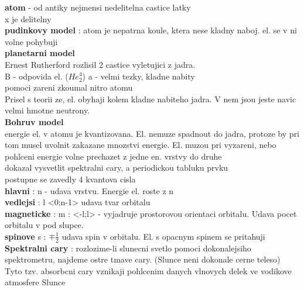 \documentclass{report}
\begin{document}
\vspace{0.5cm}
\textbf{atom} - od antiky nejmensi nedelitelna castice latky \\
x je delitelny \\
\textbf{pudinkovy model} : atom je nepatrna koule, ktera nese kladny naboj. el. se v ni volne 
pohybuji \\
\textbf{planetarni model} \\
Ernest Rutherford rozlisil 2 castice vyletujici z jadra. \\
B - odpovida el. ($He^{4}_2$) a - velmi tezky, kladne nabity \\
pomoci zareni zkoumal nitro atomu \\
Prisel s teorii ze, el. obyhaji kolem kladne nabiteho jadra. V nem jsou jeste navic velmi hmotne neutrony. \\
\textbf{Bohruv model} \\
energie el. v atomu je kvantizovana. El. nemuze spadnout do jadra, protoze by pri tom musel uvolnit zakazane mnozstvi energie. El. muzou pri vyzareni, nebo pohlceni energie volne prechazet z jedne en. vrstvy do druhe \\
dokazal vysvetlit spektralni cary, a periodickou tabluku prvku \\
postupne se zavedly 4 kvantova cisla \\
\textbf{hlavni} : n - udava vrstvu. Energie el. roste z n \\
\textbf{vedlejsi} : l <0;n-1> udava tvar orbitalu \\
\textbf{magneticke} : m : <-l;l> - vyjadruje prostorovou orientaci orbitalu. Udava pocet orbitalu v pod slupce. \\
\textbf{spinove} s : $\mp \frac{1}{2}$ udava spin v orbitalu. El. s opacnym spinem se pritahuji \\

\textbf{Spektralni cary} : rozlozime-li slunecni svetlo pomoci dokonalejsiho spektrometru, najdeme ostre tmave cary. (Slunce neni dokonale cerne teleso) \\
Tyto tzv. absorbcni cary vznikaji pohlcenim danych vlnovych delek ve vodikove atmosfere Slunce \\



\newpage

\end{document}
